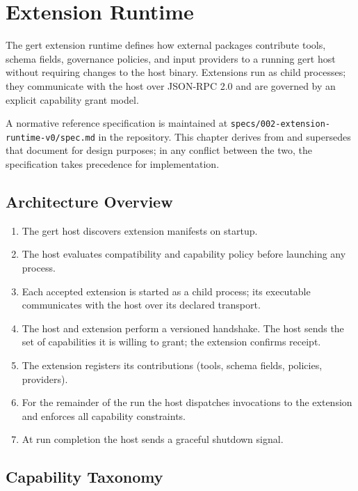 \chapter{Extension Runtime}
\label{ch:extension}

The gert extension runtime defines how external packages contribute tools,
schema fields, governance policies, and input providers to a running gert host
without requiring changes to the host binary.  Extensions run as child
processes; they communicate with the host over JSON-RPC 2.0 and are governed
by an explicit capability grant model.

A normative reference specification is maintained at
\texttt{specs/002-extension-runtime-v0/spec.md} in the repository.  This
chapter derives from and supersedes that document for design purposes; in any
conflict between the two, the specification takes precedence for
implementation.

\section{Architecture Overview}

\begin{enumerate}
  \item The gert host discovers extension manifests on startup.
  \item The host evaluates compatibility and capability policy before launching
        any process.
  \item Each accepted extension is started as a child process; its executable
        communicates with the host over its declared transport.
  \item The host and extension perform a versioned handshake.  The host sends
        the set of capabilities it is willing to grant; the extension confirms
        receipt.
  \item The extension registers its contributions (tools, schema fields,
        policies, providers).
  \item For the remainder of the run the host dispatches invocations to the
        extension and enforces all capability constraints.
  \item At run completion the host sends a graceful shutdown signal.
\end{enumerate}

\section{Capability Taxonomy}
\label{sec:ext-capabilities}

